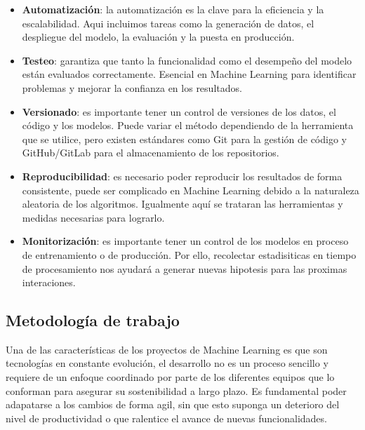     \begin{itemize}
        \item \textbf{Automatización}: la automatización es la clave para la eficiencia y la escalabilidad.
        Aqui incluimos tareas como la generación de datos, el despliegue del modelo, la evaluación y 
        la puesta en producción.
        \item \textbf{Testeo}: garantiza que tanto la funcionalidad como el desempeño del modelo están evaluados correctamente. 
        Esencial en Machine Learning para identificar problemas y mejorar la confianza en los resultados.
        \item \textbf{Versionado}: es importante tener un control de versiones de los datos, el código y los modelos. 
        Puede variar el método dependiendo de la herramienta que se utilice, pero existen estándares como Git para la gestión
        de código y GitHub/GitLab para el almacenamiento de los repositorios.
        \item \textbf{Reproducibilidad}: es necesario poder reproducir los resultados de forma consistente, puede ser
        complicado en Machine Learning debido a la naturaleza aleatoria de los algoritmos. Igualmente aquí se trataran
        las herramientas y medidas necesarias para lograrlo.
        \item \textbf{Monitorización}: es importante tener un control de los modelos en proceso de entrenamiento o de producción.
        Por ello, recolectar estadisiticas en tiempo de procesamiento nos ayudará a generar nuevas hipotesis para las proximas interaciones. 
    \end{itemize}

    \subsection{Metodología de trabajo}
    Una de las características de los proyectos de Machine Learning es que son tecnologías en constante evolución, el 
    desarrollo no es un proceso sencillo y requiere de un enfoque coordinado por parte de los diferentes
    equipos que lo conforman para asegurar su sostenibilidad a largo plazo. Es fundamental poder adapatarse a los cambios
    de forma agil, sin que esto suponga un deterioro del nivel de productividad o que ralentice el avance de nuevas
    funcionalidades.\medskip 

